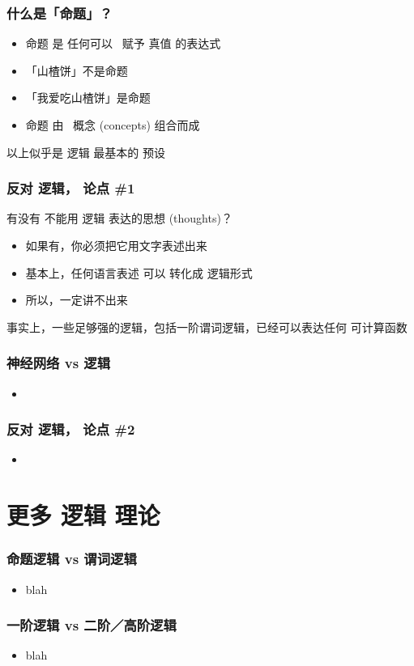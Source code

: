 \documentclass[17pt]{beamer}
\begin{document}
\begin{frame}
\frametitle{什么是「命题」？}
\begin{itemize}
	\item 命题 是 任何可以 {\color{red}\ 赋予 真值} 的表达式
	\item 「山楂饼」不是命题
	\item 「我爱吃山楂饼」是命题
	\item 命题 由 {\color{red}\ 概念} (concepts) 组合而成
\end{itemize}
以上似乎是 逻辑 最基本的 预设
\end{frame}

\begin{frame}
\frametitle{反对 逻辑， 论点 \#1}
有没有 不能用 逻辑 表达的思想 (thoughts)？
\begin{itemize}
\item 如果有，你必须把它用文字表述出来
\item 基本上，任何语言表述 可以 转化成 逻辑形式
\item 所以，一定讲不出来
\end{itemize}
事实上，一些足够强的逻辑，包括一阶谓词逻辑，已经可以表达任何 可计算函数
\end{frame}

\begin{frame}
\frametitle{神经网络 vs 逻辑}
\begin{itemize}
	\item 
\end{itemize}
\end{frame}

\begin{frame}
\frametitle{反对 逻辑， 论点 \#2}

\begin{itemize}
	\item
\end{itemize}
\end{frame}

\section[Section]{更多 逻辑 理论}
\frame{\sectionpage}

\begin{frame}
\frametitle{命题逻辑 vs 谓词逻辑}
\begin{itemize}
	\item blah
\end{itemize}
\end{frame}

\begin{frame}
\frametitle{一阶逻辑 vs 二阶／高阶逻辑}
\begin{itemize}
	\item blah
\end{itemize}
\end{frame}
\end{document}
